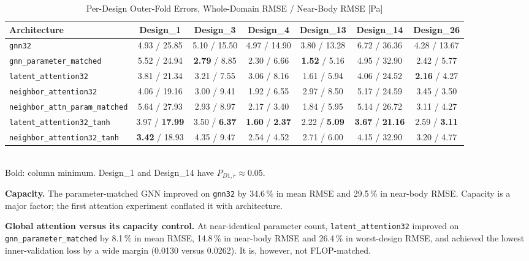 \documentclass[journal]{IEEEtran}
\newcommand{\pdone}{P_{D1,r}}
\begin{document}
\begin{table}[!t]
\centering
\caption{Per-Design Outer-Fold Errors, Whole-Domain RMSE / Near-Body RMSE [Pa]}
\label{tab:perdesign}
\setlength{\tabcolsep}{4pt}
\begin{tabular}{lcccccc}
\toprule
Architecture & Design\_1 & Design\_3 & Design\_4 & Design\_13 & Design\_14 & Design\_26 \\
\midrule
\texttt{gnn32} & 4.93 / 25.85 & 5.10 / 15.50 & 4.97 / 14.90 & 3.80 / 13.28 & 6.72 / 36.36 & 4.28 / 13.67 \\
\texttt{gnn\_parameter\_matched} & 5.52 / 24.94 & \textbf{2.79} / 8.85 & 2.30 / 6.66 & \textbf{1.52} / 5.16 & 4.95 / 32.90 & 2.42 / 5.77 \\
\texttt{latent\_attention32} & 3.81 / 21.34 & 3.21 / 7.55 & 3.06 / 8.16 & 1.61 / 5.94 & 4.06 / 24.52 & \textbf{2.16} / 4.27 \\
\texttt{neighbor\_attention32} & 4.06 / 19.16 & 3.00 / 9.41 & 1.92 / 6.55 & 2.97 / 8.50 & 5.17 / 24.59 & 3.45 / 3.50 \\
\texttt{neighbor\_attn\_param\_matched} & 5.64 / 27.93 & 2.93 / 8.97 & 2.17 / 3.40 & 1.84 / 5.95 & 5.14 / 26.72 & 3.11 / 4.27 \\
\texttt{latent\_attention32\_tanh} & 3.97 / \textbf{17.99} & 3.50 / \textbf{6.37} & \textbf{1.60} / \textbf{2.37} & 2.22 / \textbf{5.09} & \textbf{3.67} / \textbf{21.16} & 2.59 / \textbf{3.11} \\
\texttt{neighbor\_attention32\_tanh} & \textbf{3.42} / 18.93 & 4.35 / 9.47 & 2.54 / 4.52 & 2.71 / 6.00 & 4.15 / 32.90 & 3.20 / 4.77 \\
\bottomrule
\end{tabular}\\[2pt]
\footnotesize Bold: column minimum. Design\_1 and Design\_14 have $\pdone\approx0.05$.
\end{table}

\textbf{Capacity.} The parameter-matched GNN improved on \texttt{gnn32} by
34.6\,\% in mean RMSE and 29.5\,\% in near-body RMSE. Capacity is a major factor;
the first attention experiment conflated it with architecture.

\textbf{Global attention versus its capacity control.} At near-identical
parameter count, \texttt{latent\_attention32} improved on
\texttt{gnn\_parameter\_matched} by 8.1\,\% in mean RMSE, 14.8\,\% in near-body
RMSE and 26.4\,\% in worst-design RMSE, and achieved the lowest inner-validation
loss by a wide margin (0.0130 versus 0.0262). It is, however, not FLOP-matched.
\end{document}
